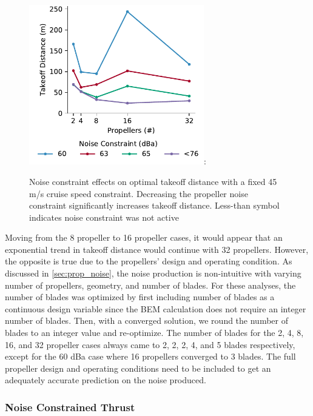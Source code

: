 \documentclass[conf]{new-aiaa}
\begin{document}
\begin{figure}[htbp]
    \centering
    \includegraphics[width=3.0in]{takeoff_speed_db}:
    \caption{Noise constraint effects on optimal takeoff distance with a fixed 45 m/s cruise speed constraint. Decreasing the propeller noise constraint significantly increases takeoff distance. Less-than symbol indicates noise constraint was not active }
    \label{f:takeoff_noise}
\end{figure}

Moving from the 8 propeller to 16 propeller cases, it would appear that an exponential trend in takeoff distance would continue with 32 propellers. However, the opposite is true due to the propellers' design and operating condition. As discussed in \cref{sec:prop_noise}, the noise production is non-intuitive with varying number of propellers, geometry, and number of blades. For these analyses, the number of blades was optimized by first including number of blades as a continuous design variable since the BEM calculation does not require an integer number of blades. Then, with a converged solution, we round the number of blades to an integer value and re-optimize.  The number of blades for the 2, 4, 8, 16, and 32 propeller cases always came to 2, 2, 2, 4, and 5 blades respectively, except for the 60 dBa case where 16 propellers converged to 3 blades.  The full propeller design and operating conditions need to be included to get an adequately accurate prediction on the noise produced.

\subsubsection{Noise Constrained Thrust}
\end{document}

